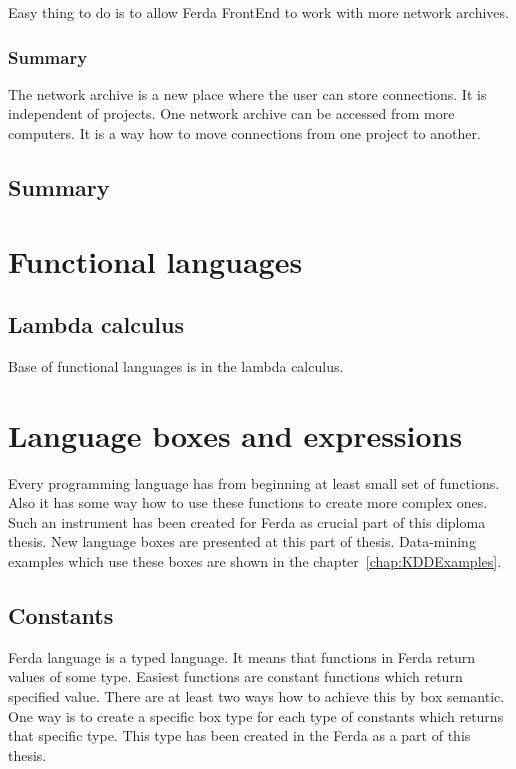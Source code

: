 \documentclass[a4paper,12pt]{book}
\begin{document}
Easy thing to do is to allow Ferda FrontEnd to work with more network archives.

\subsubsection{Summary}
The network archive is a new place where the user can store connections. It is independent of projects. One network archive can be accessed from more computers. It is a way how to move connections from one project to another.

\subsection{Summary}

\section{Functional languages}

\subsection{Lambda calculus}
Base of functional languages is in the lambda calculus. 


\section{Language boxes and expressions}
Every programming language has from beginning at least small set of functions. Also it has some way how to use these functions to create more complex ones. Such an instrument has been created for Ferda as crucial part of this diploma thesis. New language boxes are presented at this part of thesis. Data-mining examples which use these boxes are shown in the chapter~\ref{chap:KDDExamples}.

\subsection{Constants}
Ferda language is a typed language. It means that functions in Ferda return values of some type. Easiest functions are constant functions which return specified value. There are at least two ways how to achieve this by box semantic. One way is to create a specific box type for each type of constants which returns that specific type. This type has been created in the Ferda as a part of this thesis.
\end{document}
